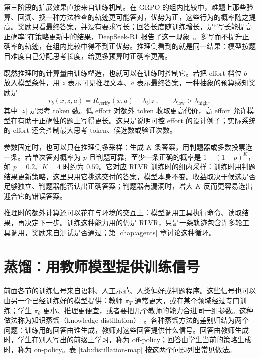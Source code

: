 第三阶段的扩展效果直接来自训练机制。在 GRPO 的组内比较中，难题上那些验算、回溯、换一种方法检查的轨迹更可能答对，优势为正，这些行为的概率随之提高。奖励只看最终答案，并没有要求写长；回答长度随训练增长，是“写长能提高正确率”在策略更新中的结果，DeepSeek-R1 报告了这一现象~\cite{deepseekr1}。多写而不提升正确率的轨迹，在组内比较中得不到正优势。推理侧看到的就是同一结果：模型按题目难度自己分配思考长度，给更多预算时正确率更高。

既然推理时的计算量由训练塑造，也就可以在训练时控制它。若把 effort 档位 \(b\) 放入模型条件，用 \(z\) 表示可见推理文本、\(a\) 表示最终答案，一种抽象的预算感知奖励是
\begin{equation}
 r_b(x,z,a)=R_{\mathrm{verify}}(x,a)-\lambda_b|z|,\qquad \lambda_{\mathrm{low}}>\lambda_{\mathrm{high}},
\end{equation}
其中 \(|z|\) 是思考 token 数。低 effort 对额外 token 收取更高代价，高 effort 允许模型在有助于正确性的题上写得更长。这只是说明可控 effort 的设计例子；实际系统的 effort 还会控制最大思考 token、候选数或验证次数。

参数固定时，也可以只在推理侧多采样：生成 \(K\) 条答案，用判题器或多数投票选一条。若单次答对概率为 \(p\) 且判题可靠，至少一条正确的概率是 \(1-(1-p)^K\)，如 \(p=0.2\)、\(K=4\) 时约为 \(0.59\)。它对应 RLVR 训练时的组内采样：训练时用判题结果更新策略，这里只用它挑选交付的答案，模型本身不变。收益取决于候选是否足够独立、判题器能否认出正确答案；判题器有漏洞时，增大 \(K\) 反而更容易选出迎合它的错误答案。

推理时的额外计算还可以花在与环境的交互上：模型调用工具执行命令、读取结果，再决定下一步。训练这种能力用的仍是 RLVR，只是一条轨迹包含许多轮工具调用，奖励来自测试是否通过；第 \ref{chap:agents} 章讨论这种循环。

\section{蒸馏：用教师模型提供训练信号}
\label{sec:distillation}

前面各节的训练信号来自语料、人工示范、人类偏好或判题程序。这些信号也可以由另一个已经训练好的模型提供：教师 \(\pi_T\) 通常更大，或在某个领域经过专门训练；学生 \(\pi_\theta\) 更小、推理更便宜，或者要把几个教师的能力合进同一组参数。这种做法称为知识蒸馏（knowledge distillation）~\cite{hinton2015distilling}。各种蒸馏方法的差别归结为两个问题：训练用的回答由谁生成，教师对这些回答提供什么信号。回答由教师生成时，学生在别人写出的前缀上学习，称为 off-policy；回答由学生当前的策略生成时，称为 on-policy。表 \ref{tab:distillation-map} 按这两个问题列出常见做法。

